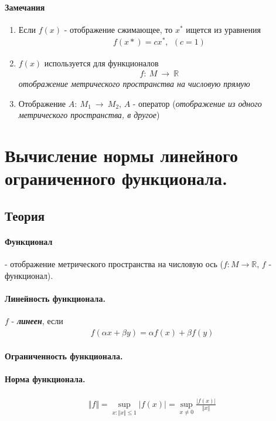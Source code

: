 \documentclass{article}[12pt]
\newcommand{\R}{\mathbb{R}}
\begin{document}
\paragraph{Замечания}
\begin{enumerate}
    \item Если $f(x)$ - отображение сжимающее, то $x^{*}$ ищется из уравнения
        \begin{eqnarray*}
            f(x*)=cx^{*},\ \ (c=1)
        \end{eqnarray*}
    \item $f(x)$ используется для функционалов
        \begin{eqnarray*}
        f:\ M\ \to\ \R
        \end{eqnarray*}
        \textit{отображение метрического пространства на числовую прямую}
    \item Отображение $A:\ M_{1}\ \to\ M_{2}$, $A$ - оператор (\textit{отображение из одного
        метрического пространства, в другое})
\end{enumerate}


\section{Вычисление нормы линейного ограниченного функционала.}
\subsection{Теория}
\paragraph{Функционал} - отображение метрического
пространства на числовую ось ($f:M\to\R$, $f$ - функционал).
\paragraph{Линейность функционала.}
$f$ - \textbf{\textit{линеен}}, если
\begin{eqnarray*}
    f(\alpha x+\beta y)=\alpha f(x)+\beta f(y)
\end{eqnarray*}
\paragraph{Ограниченность функционала.}
\paragraph{Норма функционала.}
\begin{eqnarray*}
    \Vert f \Vert
    =\sup_{x:\Vert x \Vert \leqslant 1}|f(x)|
    =\sup_{x\neq 0}\frac{\left|f(x)\right|}{\Vert x \Vert }
\end{eqnarray*}
\end{document}
